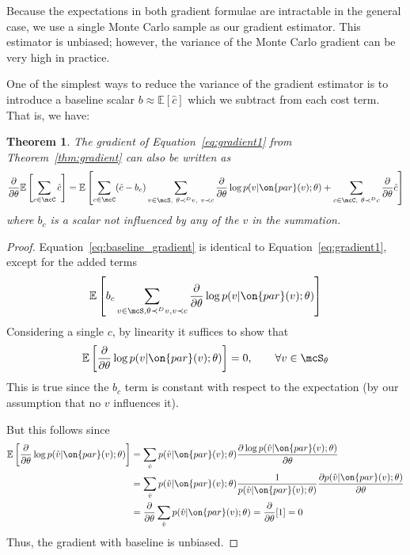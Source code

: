 \documentclass[12pt]{report}
\newtheorem{theorem}{Theorem}
\begin{document}
Because the expectations in both gradient formulae are intractable in the general case, we use a single Monte Carlo sample as our gradient estimator.
This estimator is unbiased; however, the variance of the Monte Carlo gradient can be very high in practice.



One of the simplest ways to reduce the variance of the gradient estimator is to introduce a baseline scalar $b \approx \mathbb{E}[\hat{c}]$ which we subtract from each cost term. That is, we have:
\begin{theorem}
The gradient of Equation~\ref{eq:gradient1} from Theorem~\ref{thm:gradient} can also be written as
\begin{equation}
\label{eq:baseline_gradient}
\frac{\partial}{\partial \theta} \mathbb{E}\left[ \sum_{c \in \mcC} \hat{c} \right] = \mathbb{E}\left[\sum_{c \in \mcC} (\hat{c} - b_c) \sum_{v \in \mcS,~\theta \prec^D v, ~v \prec c }  \frac{\partial}{\partial\theta} \log p(v | \on{par}(v) ; \theta )  +
 \sum_{c\in \mcC,~\theta \prec^D c} \frac{\partial}{\partial \theta} \hat{c}
\right] 
\end{equation}
where $b_c$ is a scalar not influenced by any of the $v$ in the summation.
\end{theorem}

\begin{proof}
Equation~\ref{eq:baseline_gradient} is identical to Equation~\ref{eq:gradient1}, except for the added terms
$$\mathbb{E}\left[ b_c \sum_{v\in \mcS, \theta \prec^D v, v \prec c}\frac{\partial}{\partial\theta} \log p(v | \on{par}(v) ; \theta) \right]$$
Considering a single $c$, by linearity it suffices to show that
\begin{equation*}
\mathbb{E} \left[ \frac{\partial}{\partial\theta} \log p(v | \on{par}(v) ; \theta) \right] = 0, \qquad \forall v \in \mcS_\theta
\end{equation*}
This is true since the $b_c$ term is constant with respect to the expectation (by our assumption that no $v$ influences it).

But this follows since
\begin{align*}
\mathbb{E} \left[ \frac{\partial}{\partial \theta} \log p(\hat{v} | \on{par}(v); \theta) \right] &= \sum_{\hat{v}} p(\hat{v} | \on{par}(v); \theta) \frac{\partial \log p(\hat{v} | \on{par}(v); \theta)}{\partial \theta} \\
&=  \sum_{\hat{v}} p(\hat{v} | \on{par}(v); \theta) \frac{1}{p(\hat{v} | \on{par}(v); \theta)} \frac{\partial  p(\hat{v} | \on{par}(v); \theta)}{\partial \theta}  \\
&= \frac{\partial}{\partial \theta} \sum_{\hat{v}} p(\hat{v} | \on{par}(v); \theta) =  \frac{\partial}{\partial \theta} [1] = 0
\end{align*}
Thus, the gradient with baseline is unbiased.
\end{proof}
\end{document}
